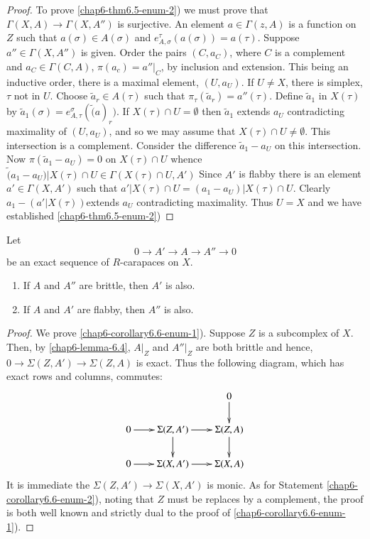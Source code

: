 \begin{proof}
To prove \ref{chap6-thm6.5-enum-2}) we must prove that $\Gamma(X, A)\rightarrow \Gamma(X, A'')$ is surjective. An element $a\in \Gamma (z, A)$ is a function on $Z$ such that $a(\sigma) \in A(\sigma)$ and $e_{A, \sigma}^{\tau}(a(\sigma)) = a(\tau)$. Suppose $a'' \in \Gamma (X, A'')$ is given. Order the pairs $(C, a_{C})$, where $C$ is a complement and $a_{C} \in \Gamma(C, A)$, $\pi(a_{c}) = a''|_{C}$, by inclusion and extension. This being an inductive order, there is a  maximal element, $(U, a_{U})$. If $U \neq X$, there is simplex, $\tau$ not in $U$. Choose $\tilde{a}_{r} \in A(\tau)$ such that $\pi_{\tau}(\tilde{a}_{r}) = a''(\tau)$. Define $\tilde{a}_{1}$ in $X(\tau)$ by $\tilde{a}_{1}(\sigma) = e_{A, \tau}^{\sigma}(\tilde(a)_{r})$. If $X(\tau) \cap U = \emptyset$ then $\tilde{a}_{1}$ extends $a_{U}$ contradicting maximality of $(U,a_{U})$, and so we may assume that $X(\tau)\cap U \neq \emptyset$. This intersection is a complement. Consider the difference $\tilde{a}_{1}-a_{U}$ on this intersection. Now $\pi(\tilde{a}_{1}-a_{U})= 0$ on $X(\tau) \cap U$ whence $^{}\tilde{(}a_{1}-a_{U})|X(\tau)\cap U \in \Gamma (X(\tau)\cap U, A')$ Since $A'$ is flabby there is an element $a' \in \Gamma (X, A')$ such that $a'|X(\tau) \cap U = (a_{1}-a_{U})|X(\tau)\cap U$. Clearly $a_{1}-(a'|X(\tau))$\pageoriginale extends $a_{U}$ contradicting maximality. Thus $U =X$ and we have established \ref{chap6-thm6.5-enum-2})
\end{proof} 

\begin{seccoro}\label{chap6-corollary-6.6}
Let
$$
0 \rightarrow A' \rightarrow A \rightarrow A'' \rightarrow 0
$$
be an exact sequence of $R$-carapaces on $X$.
    \begin{enumerate}[(1)]
    \item If $A$ and $A''$ are brittle, then $A'$ is also.\label{chap6-corollary6.6-enum-1}
    \item If $A$ and $A'$ are flabby, then $A''$ is also.\label{chap6-corollary6.6-enum-2}
    \end{enumerate} 
\end{seccoro}

\begin{proof}
We prove \ref{chap6-corollary6.6-enum-1}). Suppose $Z$ is a subcomplex of $X$. Then, by \ref{chap6-lemma-6.4}, $A|_{Z}$ and $A''|_{Z}$ are both brittle and hence, $0 \rightarrow \Sigma(Z, A')\rightarrow \Sigma(Z, A)$ is exact. Thus the following diagram, which has exact rows and columns, commutes:
 $$
 \xymatrix@=.7cm{
 & & 0\ar[d]\\
 0 \ar[r] & \Sigma(Z, A') \ar[r]\ar[d] & \Sigma(Z, A)\ar[d]\\
 0 \ar [r] & \Sigma(X, A')\ar[r] & \Sigma(X, A)
 } 
 $$                          
It is immediate the $\Sigma(Z, A')\rightarrow \Sigma(X, A')$ is monic. As for Statement \ref{chap6-corollary6.6-enum-2}), noting that $Z$ must be replaces by a complement, the proof is both well known and strictly dual to the proof of \ref{chap6-corollary6.6-enum-1}).
\end{proof}

